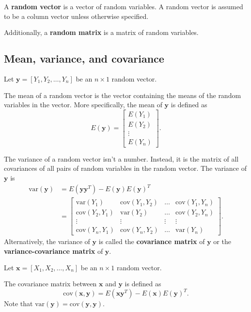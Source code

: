 \documentclass[
]{book}
\theoremstyle{definition}
\theoremstyle{definition}
\theoremstyle{definition}
\theoremstyle{definition}
\theoremstyle{remark}
\begin{document}
A \textbf{random vector} is a vector of random variables. A random vector is assumed to be a column vector unless otherwise specified.

Additionally, a \textbf{random matrix} is a matrix of random variables.

\hypertarget{mean-variance-and-covariance}{%
\subsection{Mean, variance, and covariance}\label{mean-variance-and-covariance}}

Let \(\mathbf{y}=[Y_1,Y_2,\dots,Y_n]\) be an \(n\times1\) random vector.

The mean of a random vector is the vector containing the means of the random variables in the vector. More specifically, the mean of \(\mathbf{y}\) is defined as
\[
E(\mathbf{y})=\begin{bmatrix}E(Y_1)\\E(Y_2)\\\vdots\\E(Y_n)\end{bmatrix}.
\]

The variance of a random vector isn't a number. Instead, it is the matrix of all covariances of all pairs of random variables in the random vector. The variance of \(\mathbf{y}\) is
\[
\begin{aligned}
\mathrm{var}(\mathbf{y}) &= E(\mathbf{y}\mathbf{y}^T )-E(\mathbf{y})E(\mathbf{y})^T\\
&= \begin{bmatrix}\mathrm{var}(Y_1) & \mathrm{cov}(Y_1,Y_2) &\dots &\mathrm{cov}(Y_1,Y_n)\\\mathrm{cov}(Y_2,Y_1 )&\mathrm{var}(Y_2)&\dots&\mathrm{cov}(Y_2,Y_n)\\\vdots&\vdots&\vdots&\vdots\\
\mathrm{cov}(Y_n,Y_1)&\mathrm{cov}(Y_n,Y_2)&\dots&\mathrm{var}(Y_n)\end{bmatrix}.
\end{aligned}
\]
Alternatively, the variance of \(\mathbf{y}\) is called the \textbf{covariance matrix} of \(\mathbf{y}\) or the \textbf{variance-covariance matrix} of \(\mathbf{y}\).

Let \(\mathbf{x} = [X_1, X_2, \ldots, X_n]\) be an \(n\times 1\) random vector.

The covariance matrix between \(\mathbf{x}\) and \(\mathbf{y}\) is defined as
\[
\mathrm{cov}(\mathbf{x}, \mathbf{y}) = E(\mathbf{x}\mathbf{y}^T) - E(\mathbf{x}) E(\mathbf{y})^T.
\]
Note that \(\mathrm{var}(\mathbf{y})=\mathrm{cov}(\mathbf{y}, \mathbf{y})\).
\end{document}
